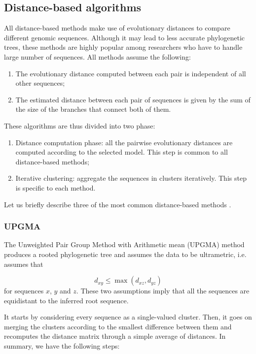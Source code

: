 \subsection{Distance-based algorithms}

All distance-based methods make use of evolutionary distances to compare different genomic sequences. Although it may lead to less accurate phylogenetic trees, these methods are highly popular among researchers who have to handle large number of sequences. All methods assume the following:

\begin{enumerate}
    \item The evolutionary distance computed between each pair is independent of all other sequences;
    \item The estimated distance between each pair of sequences is given by the sum of the size of the branches that connect both of them.
\end{enumerate}

These algorithms are thus divided into two phase: 

\begin{enumerate}
    \item Distance computation phase: all the pairwise evolutionary distances are computed according to the selected model. This step is common to all distance-based methods;
    \item Iterative clustering: aggregate the sequences in clusters iteratively. This step is specific to each method.
\end{enumerate}

Let us briefly describe three of the most common distance-based methods \cite{Z06}.

\subsubsection{UPGMA}

The Unweighted Pair Group Method with Arithmetic mean (UPGMA) method produces a rooted phylogenetic tree and assumes the data to be ultrametric, i.e. assumes that

$$d_{xy} \leq \max(d_{xz}, d_{yz})$$
for sequences $x$, $y$ and $z$. These two assumptions imply that all the sequences are equidistant to the inferred root sequence. 

It starts by considering every sequence as a single-valued cluster. Then, it goes on merging the clusters according to the smallest difference between them and recomputes the distance matrix through a simple average of distances. In summary, we have the following steps:


